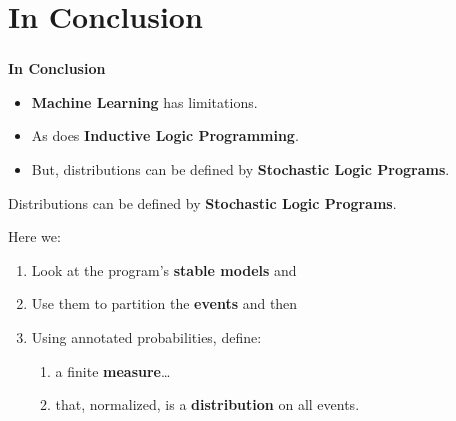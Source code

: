 \documentclass[bigger]{beamer}
\begin{document}
\section{In Conclusion}
%
%
\begin{frame}
    \frametitle{}
    \vfill
    \begin{center}
        {\huge\bf In Conclusion}
    \end{center}
    \vfill
\end{frame}
%
\begin{frame}
    \begin{itemize}
        \item \textbf{Machine Learning} has limitations.
        \item As does \textbf{Inductive Logic Programming}.
        \item But, distributions can be defined by \textbf{Stochastic Logic Programs}.
    \end{itemize}
\end{frame}
%
\begin{frame}
    Distributions can be defined by \textbf{Stochastic Logic Programs}. 
    
    \vfill
    Here we:
    \begin{enumerate}
        \item Look at the program's \textbf{stable models} and
        \item Use them to partition the \textbf{events} and then
        \item Using annotated probabilities, define:
        \begin{enumerate}
            \item a finite \textbf{measure}\ldots
            \item that, normalized, is a  \textbf{distribution} on all events.
        \end{enumerate}
    \end{enumerate}
\end{frame}
\end{document}

